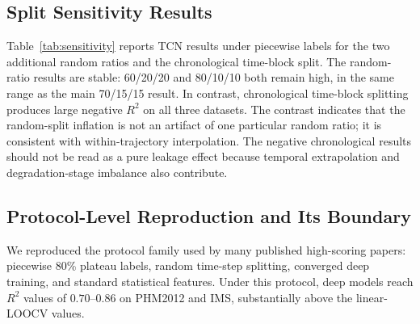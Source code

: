 \documentclass[5p,twocolumn]{elsarticle}
\begin{document}
\subsection{Split Sensitivity Results}
Table~\ref{tab:sensitivity} reports TCN results under piecewise labels for the two additional random ratios and the chronological time-block split. The random-ratio results are stable: 60/20/20 and 80/10/10 both remain high, in the same range as the main 70/15/15 result. In contrast, chronological time-block splitting produces large negative $R^2$ on all three datasets. The contrast indicates that the random-split inflation is not an artifact of one particular random ratio; it is consistent with within-trajectory interpolation. The negative chronological results should not be read as a pure leakage effect because temporal extrapolation and degradation-stage imbalance also contribute.

\begin{table}[t]
\centering
\caption{TCN split sensitivity with piecewise labels. Random rows are mean [min--max] over seeds 42, 43, 44; time-block uses chronological 70/15/15 per bearing.}
\label{tab:sensitivity}
\small
{}
\end{table}

\subsection{Protocol-Level Reproduction and Its Boundary}
We reproduced the protocol family used by many published high-scoring papers: piecewise 80\% plateau labels, random time-step splitting, converged deep training, and standard statistical features. Under this protocol, deep models reach $R^2$ values of $0.70$--$0.86$ on PHM2012 and IMS, substantially above the linear-LOOCV values.
\end{document}

